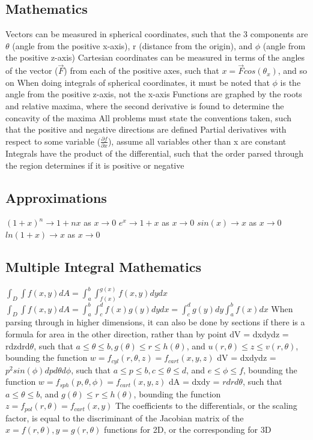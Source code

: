 \documentclass[11 pt, twoside]{article}
\newenvironment{outline*}
{
	\begin{outline}[enumerate]
	}
	{\end{outline}
}
\begin{document}
\subsection{Mathematics}
\begin{outline*}
\1 Vectors can be measured in spherical coordinates, such that the 3 components are $\theta$ (angle from the positive x-axis), r (distance from the origin), and $\phi$ (angle from the positive z-axis)
\2 Cartesian coordinates can be measured in terms of the angles of the vector ($\vec{F}$) from each of the positive axes, such that $x = \vec{F}cos(\theta_x)$, and so on
\2 When doing integrals of spherical coordinates, it must be noted that $\phi$ is the angle from the positive z-axis, not the x-axis
\1 Functions are graphed by the roots and relative maxima, where the second derivative is found to determine the concavity of the maxima
\1 All problems must state the conventions taken, such that the positive and negative directions are defined
\1 Partial derivatives with respect to some variable ($\frac{\partial f}{\partial x}$), assume all variables other than x are constant
\1 Integrals have the product of the differential, such that the order parsed through the region determines if it is positive or negative
\end{outline*}
\subsection{Approximations}
\begin{outline*}
\1 $(1 + x)^n \to 1 + nx$ as $x \to 0$
\1 $e^x \to 1 + x$ as $x \to 0$
\1 $sin(x) \to x$ as $x \to 0$
\1 $ln(1 + x) \to x$ as $x \to 0$
\end{outline*}
\subsection{Multiple Integral Mathematics}
\begin{outline*}
\1 $\int_D \int f(x, y)dA = \int^b_a \int^{g(x)}_{f(x)} f(x, y)dydx$
\1 $\int_D \int f(x, y)dA = \int^b_a \int^d_c f(x)g(y)dydx = \int^d_c g(y)dy \int^b_a f(x)dx$
\1 When parsing through in higher dimensions, it can also be done by sections if there is a formula for area in the other direction, rather than by point
\1 dV = dxdydz = rdzdrd$\theta$, such that $a \leq \theta \leq b, g(\theta) \leq r \leq h(\theta)$, and $u(r, \theta) \leq z \leq v(r, \theta)$, bounding the function $w  = f_{cyl}(r, \theta, z) = f_{cart}(x, y, z)$
\1 dV = dxdydz = $p^2sin(\phi)dpd\theta d\phi$, such that $a \leq p \leq b, c \leq \theta \leq d$, and $e \leq \phi \leq f$, bounding the function $w  = f_{sph}(p, \theta, \phi) = f_{cart}(x, y, z)$
\1 dA = dxdy = $rdrd\theta$, such that $a \leq \theta \leq b$, and $g(\theta) \leq r \leq h(\theta)$, bounding the function $z = f_{pol}(r, \theta) = f_{cart}(x, y)$
\1 The coefficients to the differentials, or the scaling factor, is equal to the discriminant of the Jacobian matrix of the $x = f(r, \theta), y = g(r, \theta)$ functions for 2D, or the corresponding for 3D
\end{outline*}
\end{document}

